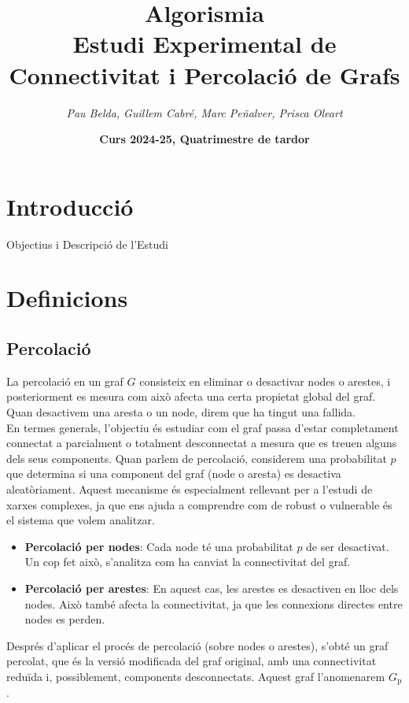 \documentclass[a4paper]{article}
\title{\textbf{\huge Algorismia}\\[0.5cm]
	\textbf{\Large Estudi Experimental de Connectivitat i Percolació de Grafs}}
\author{\emph{Pau Belda, Guillem Cabré, Marc Peñalver, Prisca Oleart}}
\date{\textbf{Curs 2024-25, Quatrimestre de tardor}}
\begin{document}
	
	\begin{titlepage}
		\clearpage\maketitle
		\thispagestyle{empty}
	\end{titlepage}
	
	\tableofcontents
	\clearpage

	\section{Introducció}
	Objectius i Descripció de l'Estudi
	\section{Definicions}
		
	\subsection{Percolació}
	
	La percolació en un graf $G$ consisteix en eliminar o desactivar nodes o arestes, i posteriorment es mesura com això afecta una certa propietat global del graf. Quan desactivem una aresta o un node, direm que ha tingut una fallida. \\
	
	En termes generals, l'objectiu és estudiar com el graf passa d'estar completament connectat a parcialment o totalment desconnectat a mesura que es treuen alguns dels seus components. Quan parlem de percolació, considerem una probabilitat $p$ que determina si una component del graf (node o aresta) es desactiva aleatòriament. Aquest mecanisme és especialment rellevant per a l'estudi de xarxes complexes, ja que ens ajuda a comprendre com de robust o vulnerable és el sistema que volem analitzar.
	
	\begin{itemize}
		\item \textbf{Percolació per nodes}: Cada node té una probabilitat $p$ de ser desactivat. Un cop fet això, s'analitza com ha canviat la connectivitat del graf.
		\item \textbf{Percolació per arestes}: En aquest cas, les arestes es desactiven en lloc dels nodes. Això també afecta la connectivitat, ja que les connexions directes entre nodes es perden.
	\end{itemize}
	
	Després d'aplicar el procés de percolació (sobre nodes o arestes), s'obté un graf percolat, que és la versió modificada del graf original, amb una connectivitat reduïda i, possiblement, components desconnectats. Aquest graf l'anomenarem $G_{\text{p}}$.
	
\end{document}
